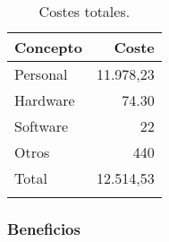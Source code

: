 \begin{longtable}[]{@{}lr@{}}
	\toprule
	\begin{minipage}[b]{0.22\columnwidth}\raggedright\strut
		\textbf{Concepto}\strut
	\end{minipage} & \begin{minipage}[b]{0.22\columnwidth}\raggedright\strut
		\textbf{Coste}\strut
	\end{minipage}\tabularnewline
	\midrule
	\endhead
	\begin{minipage}[t]{0.22\columnwidth}\raggedright\strut
		Personal\strut
	\end{minipage} & \begin{minipage}[t]{0.22\columnwidth}\raggedright\strut
		11.978,23 \officialeuro\strut
	\end{minipage}\tabularnewline
	\begin{minipage}[t]{0.22\columnwidth}\raggedright\strut
		Hardware\strut
	\end{minipage} & \begin{minipage}[t]{0.22\columnwidth}\raggedright\strut
		74.30 \officialeuro\strut
	\end{minipage}\tabularnewline
	\begin{minipage}[t]{0.22\columnwidth}\raggedright\strut
		Software\strut
	\end{minipage} & \begin{minipage}[t]{0.22\columnwidth}\raggedright\strut
		22 \officialeuro\strut
	\end{minipage}\tabularnewline
	\begin{minipage}[t]{0.22\columnwidth}\raggedright\strut
		Otros\strut
	\end{minipage} & \begin{minipage}[t]{0.22\columnwidth}\raggedright\strut
		440 \officialeuro\strut
	\end{minipage}\tabularnewline
	\midrule
	\begin{minipage}[t]{0.22\columnwidth}\raggedright\strut
		Total\strut
	\end{minipage} & \begin{minipage}[t]{0.22\columnwidth}\raggedright\strut
		12.514,53 \officialeuro\strut
	\end{minipage}\tabularnewline
	\bottomrule
	\caption{Costes totales.}
\end{longtable}

\subsubsection{Beneficios}

